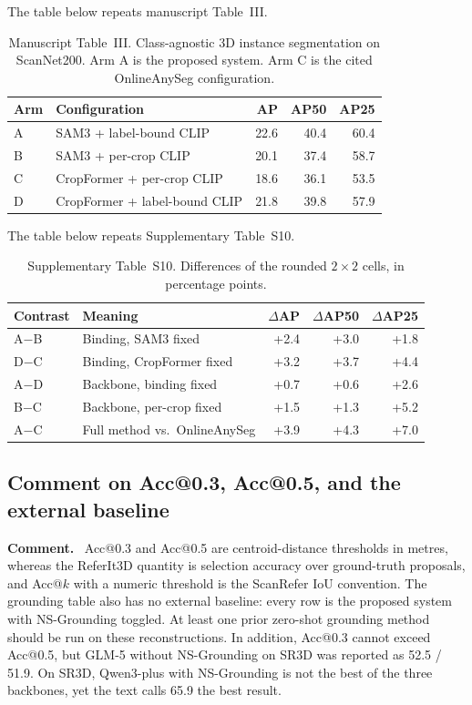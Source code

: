 \documentclass[11pt]{article}
\newcommand{\revcomment}[1]{%
  \par\vspace{0.6em}\noindent\textcolor{revblue}{\textbf{Comment.}}\ %
  \textcolor{revblue}{#1}\par\vspace{0.4em}}
\begin{document}
\noindent The table below repeats manuscript Table~III.

\begin{table}[ht]
\centering
\caption{Manuscript Table~III. Class-agnostic 3D instance segmentation on ScanNet200. Arm A is the proposed system. Arm C is the cited OnlineAnySeg configuration.}
\label{tab:recon}
\small
\begin{tabular}{llrrr}
\toprule
Arm & Configuration & AP & AP50 & AP25 \\
\midrule
A & SAM3 + label-bound CLIP & 22.6 & 40.4 & 60.4 \\
B & SAM3 + per-crop CLIP & 20.1 & 37.4 & 58.7 \\
C & CropFormer + per-crop CLIP & 18.6 & 36.1 & 53.5 \\
D & CropFormer + label-bound CLIP & 21.8 & 39.8 & 57.9 \\
\bottomrule
\end{tabular}
\end{table}

\noindent The table below repeats Supplementary Table~S10.

\begin{table}[ht]
\centering
\caption{Supplementary Table~S10. Differences of the rounded \(2\times 2\) cells, in percentage points.}
\label{tab:recondiff}
\small
\begin{tabular}{llrrr}
\toprule
Contrast & Meaning & \(\Delta\)AP & \(\Delta\)AP50 & \(\Delta\)AP25 \\
\midrule
A\(-\)B & Binding, SAM3 fixed & +2.4 & +3.0 & +1.8 \\
D\(-\)C & Binding, CropFormer fixed & +3.2 & +3.7 & +4.4 \\
A\(-\)D & Backbone, binding fixed & +0.7 & +0.6 & +2.6 \\
B\(-\)C & Backbone, per-crop fixed & +1.5 & +1.3 & +5.2 \\
A\(-\)C & Full method vs.\ OnlineAnySeg & +3.9 & +4.3 & +7.0 \\
\bottomrule
\end{tabular}
\end{table}

\subsection*{Comment on Acc@0.3, Acc@0.5, and the external baseline}

\revcomment{Acc@0.3 and Acc@0.5 are centroid-distance thresholds in metres, whereas the ReferIt3D quantity is selection accuracy over ground-truth proposals, and Acc@\(k\) with a numeric threshold is the ScanRefer IoU convention. The grounding table also has no external baseline: every row is the proposed system with NS-Grounding toggled. At least one prior zero-shot grounding method should be run on these reconstructions. In addition, Acc@0.3 cannot exceed Acc@0.5, but GLM-5 without NS-Grounding on SR3D was reported as 52.5 / 51.9. On SR3D, Qwen3-plus with NS-Grounding is not the best of the three backbones, yet the text calls 65.9 the best result.}
\end{document}
